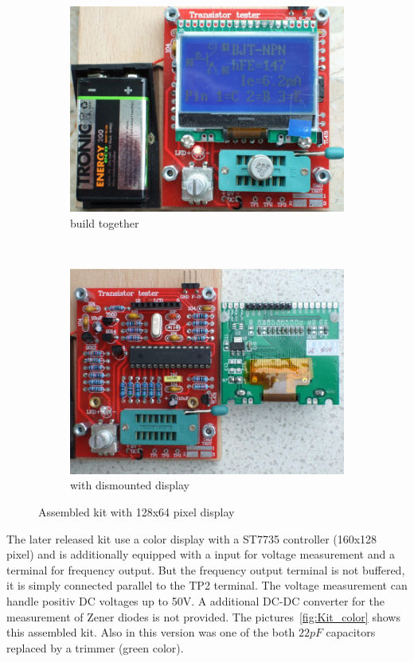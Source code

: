 \begin{figure}[H]
  \begin{subfigure}[b]{.5\textwidth}
    \centering
    \includegraphics[width=1.\textwidth]{../PNG/Kit_ST7565a.jpg}
    \caption{build together}
  \end{subfigure}
  ~
  \begin{subfigure}[b]{.5\textwidth}
    \centering
    \includegraphics[width=1.\textwidth]{../PNG/Kit_ST7565b.jpg}
    \caption{with dismounted display}
  \end{subfigure}
  \caption{Assembled kit with 128x64 pixel display}
  \label{fig:Kit_mono}
\end{figure}

The later released kit use a color display with a ST7735 controller (160x128 pixel)
and is additionally equipped with a input for voltage measurement and a terminal for frequency output.
But the frequency output terminal is not buffered, it is simply connected parallel to the TP2 terminal.
The voltage measurement can handle positiv DC voltages up to 50V. A additional DC-DC converter
for the measurement of Zener diodes is not provided. 
The pictures~\ref{fig:Kit_color} shows this assembled kit.
Also in this version was one of the both \(22 pF\) capacitors replaced
by a trimmer (green color).

